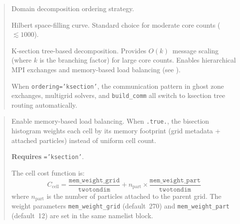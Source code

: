 \label{param:ordering}

\begin{quote}
Domain decomposition ordering strategy.
\begin{description}[style=nextline,leftmargin=2.5cm,font=\ttfamily]
  \item[`hilbert'] Hilbert space-filling curve.  Standard choice for
    moderate core counts ($\lesssim 1000$).
  \item[`ksection'] K-section tree-based decomposition.  Provides
    $O(k)$~message scaling (where $k$ is the branching factor) for
    large core counts.  Enables hierarchical MPI exchanges and
    memory-based load balancing (see ).
\end{description}
When \texttt{ordering='ksection'}, the communication pattern in ghost
zone exchanges, multigrid solvers, and \texttt{build\_comm} all switch
to ksection tree routing automatically.
\end{quote}

\label{param:memory_balance}

\begin{quote}
Enable memory-based load balancing.  When \texttt{.true.}, the
bisection histogram weights each cell by its memory footprint (grid
metadata + attached particles) instead of uniform cell count.

\textbf{Requires} \texttt{='ksection'}.

The cell cost function is:
\[
  C_{\text{cell}} = \frac{\texttt{mem\_weight\_grid}}{\texttt{twotondim}}
                + n_{\text{part}} \times
                  \frac{\texttt{mem\_weight\_part}}{\texttt{twotondim}}
\]
where $n_{\text{part}}$ is the number of particles attached to the parent
grid.  The weight parameters \texttt{mem\_weight\_grid} (default~270) and
\texttt{mem\_weight\_part} (default~12) are set in the same namelist block.

\end{quote}

\label{param:sink}

